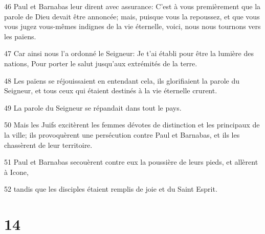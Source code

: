 \par 46 Paul et Barnabas leur dirent avec assurance: C'est à vous premièrement que la parole de Dieu devait être annoncée; mais, puisque vous la repoussez, et que vous vous jugez vous-mêmes indignes de la vie éternelle, voici, nous nous tournons vers les païens.
\par 47 Car ainsi nous l'a ordonné le Seigneur: Je t'ai établi pour être la lumière des nations, Pour porter le salut jusqu'aux extrémités de la terre.
\par 48 Les païens se réjouissaient en entendant cela, ils glorifiaient la parole du Seigneur, et tous ceux qui étaient destinés à la vie éternelle crurent.
\par 49 La parole du Seigneur se répandait dans tout le pays.
\par 50 Mais les Juifs excitèrent les femmes dévotes de distinction et les principaux de la ville; ils provoquèrent une persécution contre Paul et Barnabas, et ils les chassèrent de leur territoire.
\par 51 Paul et Barnabas secouèrent contre eux la poussière de leurs pieds, et allèrent à Icone,
\par 52 tandis que les disciples étaient remplis de joie et du Saint Esprit.

\chapter{14}

